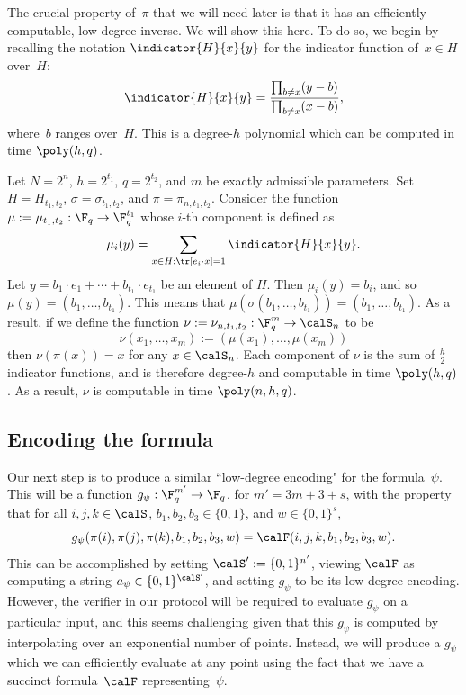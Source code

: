 The crucial property of~$\pi$ that we will need later is that it has an efficiently-computable, low-degree inverse.
We will show this here.
To do so, we begin by recalling the notation $\indicator{H}{x}{y}$ for the indicator function of~$x \in H$ over~$H$:
\begin{equation*}
\indicator{H}{x}{y} = \frac{\prod_{b \neq x}(y - b)}{\prod_{b \neq x}(x-b)},
\end{equation*}
where~$b$ ranges over~$H$.
This is a degree-$h$ polynomial which can be computed in time $\poly(h, q)$.
\begin{definition}
Let $N= 2^n$, $h = 2^{t_1}$, $q= 2^{t_2}$, and $m$ be exactly admissible parameters.
Set $H = H_{t_1, t_2}$, $\sigma = \sigma_{t_1, t_2}$, and $\pi = \pi_{n, t_1, t_2}$.
Consider the function $\mu:= \mu_{t_1, t_2}:\F_q \rightarrow \F_q^{t_1}$ whose $i$-th component is defined as
\begin{equation*}
\mu_i(y) = \sum_{x \in H : \tr[e_i \cdot x] = 1} \indicator{H}{x}{y}.
\end{equation*}
Let $y = b_1 \cdot e_1 + \cdots + b_{t_1} \cdot e_{t_1}$ be an element of $H$.
Then $\mu_i(y) = b_i$, and so $\mu(y) = (b_1, \ldots, b_{t_1})$.
This means that $\mu(\sigma(b_1, \ldots, b_{t_1})) = (b_1, \ldots, b_{t_1})$.
As a result, if we define the function $\nu := \nu_{n, t_1, t_2} : \F_q^m \rightarrow \calS_n$ to be
\begin{equation*}
\nu(x_1, \ldots, x_m) := (\mu(x_1), \ldots, \mu(x_m))
\end{equation*}
then $\nu(\pi(x)) = x$ for any $x \in \calS_n$.
Each component of $\nu$ is the sum of $\frac{h}{2}$ indicator functions,
and is therefore degree-$h$ and computable in time $\poly(h,q)$.
As a result, $\nu$ is computable in time $\poly(n,h,q)$.
\end{definition}


\subsection{Encoding the formula}

Our next step is to produce a similar ``low-degree encoding" for the formula~$\psi$.
This will be a function $g_\psi: \F_q^{m'} \rightarrow \F_q$, for $m' = 3m + 3+s$, with the property that for all $i, j, k \in \calS$, $b_1, b_2, b_3 \in \{0, 1\}$, and $w \in \{0, 1\}^s$,
\begin{equation*}
g_\psi(\pi(i), \pi(j), \pi(k), b_1, b_2, b_3, w) = \calF(i, j, k, b_1, b_2, b_3, w).
\end{equation*}
This can be accomplished by setting $\calS' := \{0, 1\}^{n'}$, viewing $\calF$ as computing a string $a_{\psi} \in \{0, 1\}^{\calS'}$, and setting $g_{\psi}$ to be its low-degree encoding.
However, the verifier in our protocol will be required to evaluate $g_\psi$ on a particular input,
and this seems challenging given that this $g_{\psi}$ is computed by interpolating over an exponential number of points.
Instead, we will produce a $g_\psi$ which we can efficiently evaluate at any point using the fact that we have a succinct formula~$\calF$ representing~$\psi$.

